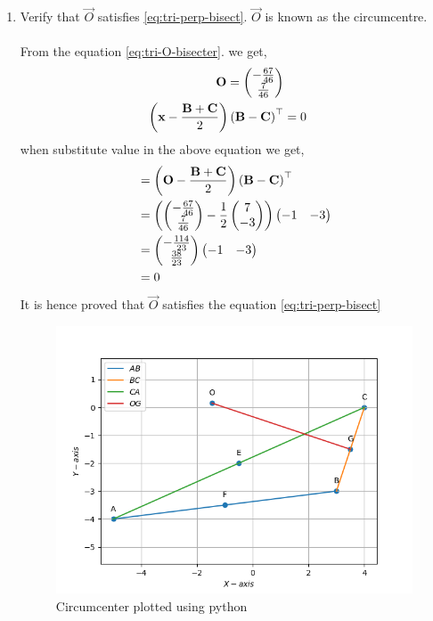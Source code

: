 \documentclass[10pt]{book}
\begin{document}
\begin{enumerate}[label=\thesection.\arabic*.,ref=\thesection.\theenumi]
\item Verify that $\vec{O}$ satisfies
\eqref{eq:tri-perp-bisect}.
$\vec{O}$ is known as the circumcentre.\\
 \solution\\
 From the equation \eqref{eq:tri-O-bisecter}. we get,
 \begin{align}
\mathbf{O}=\begin{pmatrix}-\frac{67}{46}\\ \frac{7}{46}\end{pmatrix} \\
\left(\mathbf{x}-\frac{\mathbf{B}+\mathbf{C}}{2}\right)\left(\mathbf{B}-\mathbf{C}\right)^{\top} &= 0
\end{align}
when substitute value in the above equation we get,
\begin{align}
	&=\left(\mathbf{O}-\frac{\mathbf{B}+\mathbf{C}}{2}\right)\left(\mathbf{B}-\mathbf{C}\right)^{\top}\\
	&=\left(\begin{pmatrix}-\frac{67}{46}\\ \frac{7}{46}\end{pmatrix}- \frac{1}{2}\begin{pmatrix}7\\-3\end{pmatrix}\right) \begin{pmatrix}-1 &-3\end{pmatrix}\\
	&=\begin{pmatrix}-\frac{114}{23}\\ \frac{38}{23}\end{pmatrix}\begin{pmatrix}-1 &-3\end{pmatrix}\\
	&=0
\end{align}
It is hence proved that $\vec{O}$ satisfies the equation \eqref{eq:tri-perp-bisect}
\begin{figure}[H]
\centering
\includegraphics[width=\columnwidth]{figs/O_satisfy.png}
\caption{Circumcenter plotted using python}
\label{fig:Circumcenter to BC}
\end{figure}


\end{enumerate}
\end{document}
